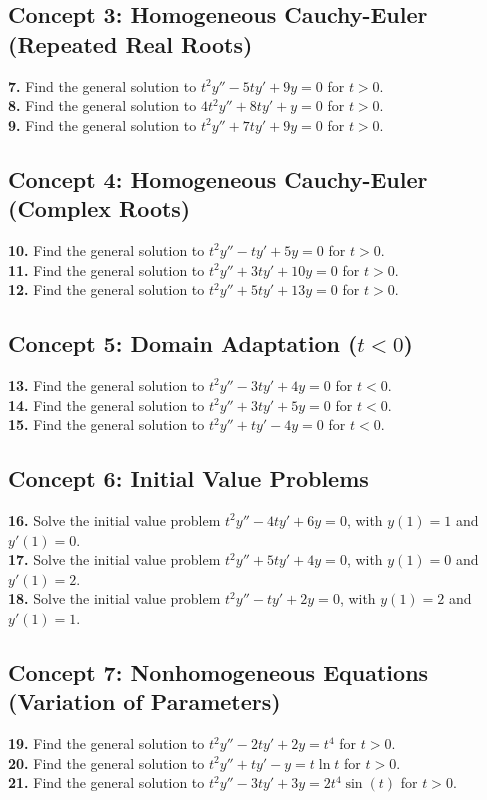 \documentclass[11pt]{article}
\begin{document}
\subsection*{Concept 3: Homogeneous Cauchy-Euler (Repeated Real Roots)}
\textbf{7.} Find the general solution to $t^2 y'' - 5ty' + 9y = 0$ for $t > 0$. \\
\textbf{8.} Find the general solution to $4t^2 y'' + 8ty' + y = 0$ for $t > 0$. \\
\textbf{9.} Find the general solution to $t^2 y'' + 7ty' + 9y = 0$ for $t > 0$.

\subsection*{Concept 4: Homogeneous Cauchy-Euler (Complex Roots)}
\textbf{10.} Find the general solution to $t^2 y'' - ty' + 5y = 0$ for $t > 0$. \\
\textbf{11.} Find the general solution to $t^2 y'' + 3ty' + 10y = 0$ for $t > 0$. \\
\textbf{12.} Find the general solution to $t^2 y'' + 5ty' + 13y = 0$ for $t > 0$.

\subsection*{Concept 5: Domain Adaptation ($t < 0$)}
\textbf{13.} Find the general solution to $t^2 y'' - 3ty' + 4y = 0$ for $t < 0$. \\
\textbf{14.} Find the general solution to $t^2 y'' + 3ty' + 5y = 0$ for $t < 0$. \\
\textbf{15.} Find the general solution to $t^2 y'' + ty' - 4y = 0$ for $t < 0$.

\subsection*{Concept 6: Initial Value Problems}
\textbf{16.} Solve the initial value problem $t^2 y'' - 4ty' + 6y = 0$, with $y(1) = 1$ and $y'(1) = 0$. \\
\textbf{17.} Solve the initial value problem $t^2 y'' + 5ty' + 4y = 0$, with $y(1) = 0$ and $y'(1) = 2$. \\
\textbf{18.} Solve the initial value problem $t^2 y'' - ty' + 2y = 0$, with $y(1) = 2$ and $y'(1) = 1$.

\subsection*{Concept 7: Nonhomogeneous Equations (Variation of Parameters)}
\textbf{19.} Find the general solution to $t^2 y'' - 2ty' + 2y = t^4$ for $t > 0$. \\
\textbf{20.} Find the general solution to $t^2 y'' + ty' - y = t \ln t$ for $t > 0$. \\
\textbf{21.} Find the general solution to $t^2 y'' - 3ty' + 3y = 2t^4 \sin(t)$ for $t > 0$.
\end{document}
